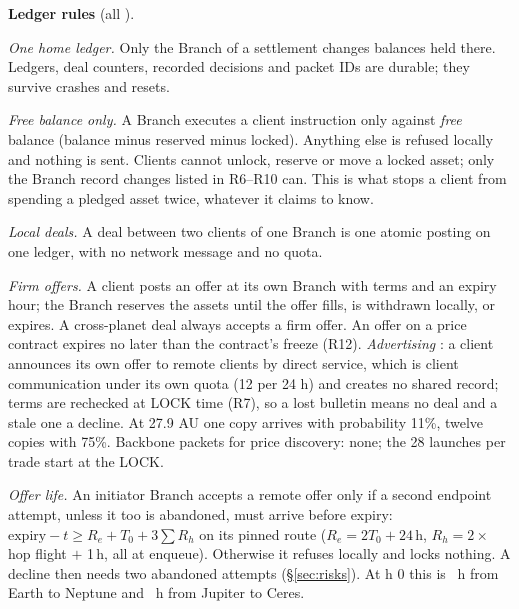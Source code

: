 \textbf{Ledger rules} (all \implemented).
\begin{description}[leftmargin=2.2em,style=sameline]
\item[R1] \emph{One home ledger.} Only the Branch of a settlement changes balances held there. Ledgers, deal
counters, recorded decisions and packet IDs are durable; they survive crashes and resets.
\item[R2] \emph{Free balance only.} A Branch executes a client instruction only against \emph{free} balance
(balance minus reserved minus locked). Anything else is refused locally and nothing is sent. Clients cannot unlock,
reserve or move a locked asset; only the Branch record changes listed in R6--R10 can. This is what stops a client
from spending a pledged asset twice, whatever it claims to know.
\item[R3] \emph{Local deals.} A deal between two clients of one Branch is one atomic posting on one ledger, with no
network message and no quota.
\item[R4] \emph{Firm offers.} A client posts an offer at its own Branch with terms and an expiry hour; the Branch
reserves the assets until the offer fills, is withdrawn locally, or expires. A cross-planet deal always accepts a firm
offer. An offer on a price contract expires no later than the contract's freeze (R12). \emph{Advertising} \extension:
a client announces its own offer to remote clients by direct service, which is client communication under its own quota
(12 per 24 h) and creates no shared record; terms are rechecked at LOCK time (R7), so a lost bulletin means no deal and
a stale one a decline. At 27.9 AU one copy arrives with probability 11\%, twelve copies with 75\%. Backbone packets
for price discovery: none; the 28 launches per trade start at the LOCK.
\item[R5] \emph{Offer life.} An initiator Branch accepts a remote offer only if a second endpoint attempt, unless it
too is abandoned, must arrive before expiry: $\text{expiry} - t \ge R_e + T_0 + 3\sum R_h$ on its pinned route
($R_e = 2T_0 + 24$\,h, $R_h = 2\times$hop flight $+$ 1\,h, all at enqueue). Otherwise it refuses locally and locks
nothing. A decline then needs two abandoned attempts (\S\ref{sec:risks}). At h 0 this is \EtwoLifeEarthNeptune\ h
from Earth to Neptune and \EtwoLifeJupiterCeres\ h from Jupiter to Ceres.
\end{description}


